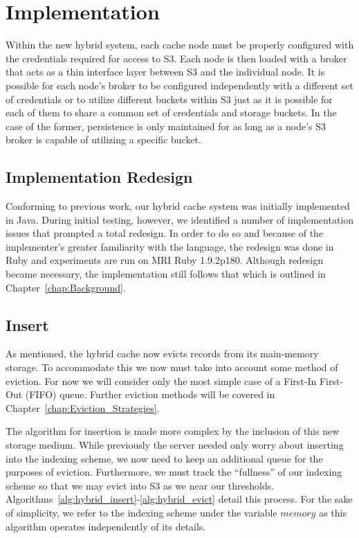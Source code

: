 
\section{Implementation} %
\label{sec:Implementation}
Within the new hybrid system, each cache node must be properly configured with
the credentials required for access to S3. Each node is then loaded with a
broker that acts as a thin interface layer between S3 and the individual node.
It is possible for each node's broker to be configured independently with a
different set of credentials or to utilize different buckets within S3 just as
it is possible for each of them to share a common set of credentials and
storage buckets. In the case of the former, persistence is only maintained for
as long as a node's S3 broker is capable of utilizing a specific bucket.

\subsection{Implementation Redesign} %
\label{sec:hybrid_redesign}
Conforming to previous work\cite{chiu_ijngc11,chiu_ccgrid11}, our hybrid cache
system was initially implemented in Java. During initial testing, however, we
identified a number of implementation issues that prompted a total redesign. In
order to do so and because of the implementer's greater familiarity with the
language, the redesign was done in Ruby and experiments are run on MRI Ruby
1.9.2p180. Although redesign became necessary, the implementation still
follows that which is outlined in Chapter~\ref{chap:Background}.


\subsection{Insert} %
\label{sub:hybrid_insert}
As mentioned, the hybrid cache now evicts records from its main-memory storage.
To accommodate this we now must take into account some method of eviction. For
now we will consider only the most simple case of a First-In First-Out (FIFO)
queue. Further eviction methods will be covered in
Chapter~\ref{chap:Eviction_Strategies}.

The algorithm for insertion is made more complex by the inclusion of this new
storage medium. While previously the server needed only worry about inserting
into the indexing scheme, we now need to keep an additional queue for the
purposes of eviction. Furthermore, we must track the ``fullness'' of our
indexing scheme so that we may evict into S3 as we near our thresholds.
Algorithms~\ref{alg:hybrid_insert}-\ref{alg:hybrid_evict} detail this process.
For the sake of simplicity, we refer to the indexing scheme under the variable
$memory$ as this algorithm operates independently of its details.

